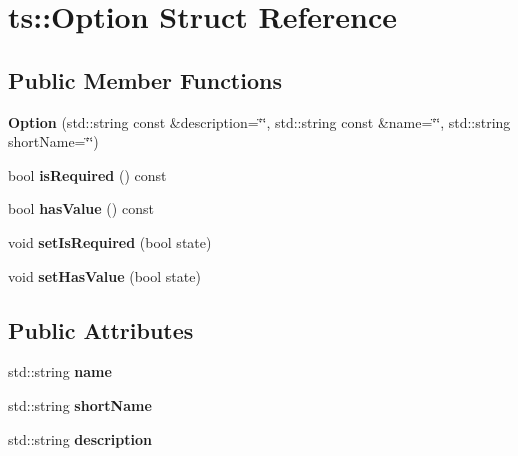 \hypertarget{structts_1_1_option}{}\section{ts\+:\+:Option Struct Reference}
\label{structts_1_1_option}
\subsection*{Public Member Functions}
\begin{DoxyCompactItemize}
\item 
\mbox{\label{structts_1_1_option_aceef3c5ffc2f332aa3e2350f61abfe75}} 
{\bfseries Option} (std\+::string const \&description=\char`\"{}\char`\"{}, std\+::string const \&name=\char`\"{}\char`\"{}, std\+::string short\+Name=\char`\"{}\char`\"{})
\item 
\mbox{\label{structts_1_1_option_a6bbab372f320c3e290c8d7665f6b771c}} 
bool {\bfseries is\+Required} () const
\item 
\mbox{\label{structts_1_1_option_ab72f836e79c97a0701a7297b64ba4cbe}} 
bool {\bfseries has\+Value} () const
\item 
\mbox{\label{structts_1_1_option_a71e8f36453f42f0bc0ce714b381af87c}} 
void {\bfseries set\+Is\+Required} (bool state)
\item 
\mbox{\label{structts_1_1_option_ac860f059ba576ad8d8a206c7aef2c026}} 
void {\bfseries set\+Has\+Value} (bool state)
\end{DoxyCompactItemize}
\subsection*{Public Attributes}
\begin{DoxyCompactItemize}
\item 
\mbox{\label{structts_1_1_option_a2fb94cede2b4c8eb012013bc01d6c1c9}} 
std\+::string {\bfseries name}
\item 
\mbox{\label{structts_1_1_option_a6337eaf84d124c11c028b5a1d8db4d75}} 
std\+::string {\bfseries short\+Name}
\item 
\mbox{\label{structts_1_1_option_a3e4741cd5d3555da48762f6534463e14}} 
std\+::string {\bfseries description}
\end{DoxyCompactItemize}
